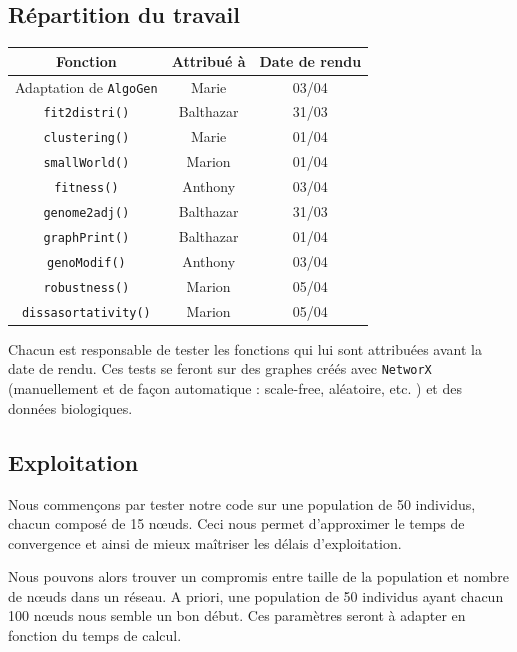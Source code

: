 \subsection{Répartition du travail}

\begin{center}
\begin{table}[!h]
\begin{tabular}{|c|c|c|}
\hline \textbf{Fonction} & \textbf{Attribué à} & \textbf{Date de rendu} \\
\hline
Adaptation de \verb?AlgoGen? & Marie & 03/04 \\
\hline
\verb?fit2distri()? & Balthazar & 31/03 \\
\hline
\verb?clustering()? & Marie & 01/04\\
\hline 
\verb?smallWorld()? & Marion & 01/04\\
\hline
\verb?fitness()? & Anthony & 03/04\\
\hline 
\verb?genome2adj()? & Balthazar & 31/03 \\
\hline 
\verb?graphPrint()? & Balthazar & 01/04 \\
\hline 
\verb?genoModif()? & Anthony & 03/04 \\
\hline 
\verb?robustness()? & Marion & 05/04 \\
\hline 
\verb?dissasortativity()? & Marion & 05/04\\
\hline 
\end{tabular}
\end{table}
\end{center}

Chacun est responsable de tester les fonctions qui lui sont attribuées avant la date de rendu. Ces tests se feront sur des graphes créés avec \verb?NetworX? (manuellement et de façon automatique : scale-free, aléatoire, etc. ) et des données biologiques.

\subsection{Exploitation}

Nous commençons par tester notre code sur une population de 50 individus, chacun composé de 15 nœuds. Ceci nous permet d'approximer le temps de convergence et ainsi de mieux ma\^itriser les délais d'exploitation.

Nous pouvons alors trouver un compromis entre taille de la population et nombre de nœuds dans un réseau. A priori, une population de 50 individus ayant chacun 100 nœuds nous semble un bon début. Ces paramètres seront à adapter en fonction du temps de calcul.


